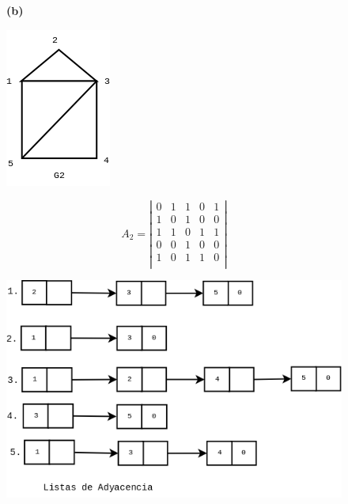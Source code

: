 \documentclass[10pt,a5paper]{book}
\begin{document}
\begin{figure}[H]
\begin{flushleft}\textbf{(b)}\end{flushleft}
\parbox{1cm}
{
  \begin{flushright}
  \includegraphics[scale=0.5]{Fig1_13_b.png}
  \end{flushright}
}
\hfill
\parbox{3cm}
{
  \begin{flushleft}
    \[A_2 = \left| 
      \begin{array}{ccccc}
        0 & 1 & 1 & 0 & 1 \\
        1 & 0 & 1 & 0 & 0 \\
        1 & 1 & 0 & 1 & 1 \\
        0 & 0 & 1 & 0 & 0 \\
        1 & 0 & 1 & 1 & 0 \\
      \end{array}
    \right|
    \]
  \end{flushleft}
}
\vfill
\parbox{3cm}
{
  \begin{flushleft}
    \hspace*{-.8in}\includegraphics[scale=0.35]{Fig1_13_b3.png}
  \end{flushleft}
}
\end{figure}
\end{document}
